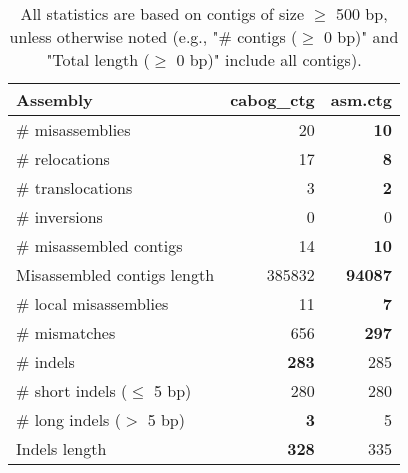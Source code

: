 \documentclass[12pt,a4paper]{article}
\begin{document}
\begin{table}[ht]
\begin{center}
\caption{All statistics are based on contigs of size $\geq$ 500 bp, unless otherwise noted (e.g., "\# contigs ($\geq$ 0 bp)" and "Total length ($\geq$ 0 bp)" include all contigs).}
\begin{tabular}{|l*{2}{|r}|}
\hline
Assembly & cabog\_ctg & asm.ctg \\ \hline
\# misassemblies & 20 & {\bf 10} \\ \hline
\hspace{5mm}\# relocations & 17 & {\bf 8} \\ \hline
\hspace{5mm}\# translocations & 3 & {\bf 2} \\ \hline
\hspace{5mm}\# inversions & 0 & 0 \\ \hline
\# misassembled contigs & 14 & {\bf 10} \\ \hline
Misassembled contigs length & 385832 & {\bf 94087} \\ \hline
\# local misassemblies & 11 & {\bf 7} \\ \hline
\# mismatches & 656 & {\bf 297} \\ \hline
\# indels & {\bf 283} & 285 \\ \hline
\hspace{5mm}\# short indels ($\leq$ 5 bp) & 280 & 280 \\ \hline
\hspace{5mm}\# long indels ($>$ 5 bp) & {\bf 3} & 5 \\ \hline
Indels length & {\bf 328} & 335 \\ \hline
\end{tabular}
\end{center}
\end{table}
\end{document}
